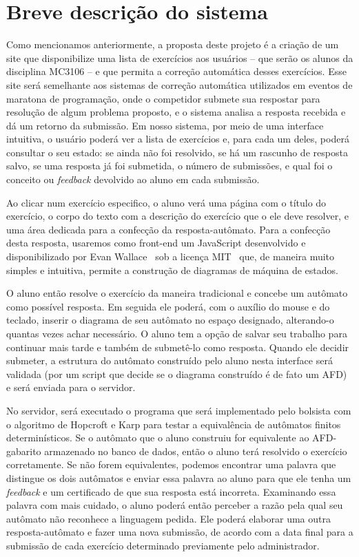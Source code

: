 \documentclass[
	12pt,				%
	openany,
	oneside,
	a4paper,			%
	english,			%
	brazil,				%
	]{abntex2}
\begin{document}
\section {Breve descrição do sistema}

Como mencionamos anteriormente, a proposta deste projeto é a criação de um site que disponibilize uma lista de exercícios aos usuários -- que serão os alunos da disciplina MC3106 -- e que permita a correção automática desses exercícios. Esse site será semelhante aos sistemas de correção automática utilizados em eventos de maratona de programação, onde o competidor submete sua respostar para resolução de algum problema proposto, e o sistema analisa a resposta recebida e dá um retorno da submissão. Em nosso sistema, por meio de uma interface intuitiva, o usuário poderá ver a lista de exercícios e, para cada um deles, poderá consultar o seu estado: se ainda não foi resolvido, se há um rascunho de resposta salvo, se uma resposta já foi submetida, o número de submissões, e qual foi o conceito ou \emph{feedback} devolvido ao aluno em cada submissão.

Ao clicar num exercício especifico, o aluno verá uma página com o título do exercício, o corpo do texto com a descrição do exercício que o ele deve resolver, e uma área dedicada para a confecção da resposta-autômato. Para a confecção desta resposta, usaremos como front-end um JavaScript desenvolvido e disponibilizado por Evan Wallace~\cite{evan} sob a licença MIT~\cite{mit} que, de maneira muito simples e intuitiva, permite a construção de diagramas de máquina de estados.

O aluno então resolve o exercício da maneira tradicional e concebe um autômato como possível resposta. Em seguida ele poderá, com o auxílio do mouse e do teclado, inserir o diagrama de seu autômato no espaço designado, alterando-o quantas vezes achar necessário. O aluno tem a opção de salvar seu trabalho para continuar mais tarde e também de submetê-lo como resposta. Quando ele decidir submeter, a estrutura do autômato construído pelo aluno nesta interface será validada (por um script que decide se o diagrama construído é de fato um AFD) e será enviada para o servidor.

No servidor, será executado o programa que será implementado pelo bolsista com o algoritmo de Hopcroft e Karp para testar a equivalência de autômatos finitos determinísticos. Se o autômato que o aluno construiu for equivalente ao AFD-gabarito armazenado no banco de dados, então o aluno terá resolvido o exercício corretamente. Se não forem equivalentes, podemos encontrar uma palavra que distingue os dois autômatos e enviar essa palavra ao aluno para que ele tenha um \emph{feedback} e um certificado de que sua resposta está incorreta. Examinando essa palavra com mais cuidado, o aluno poderá então perceber a razão pela qual seu autômato não reconhece a linguagem pedida. Ele poderá elaborar uma outra resposta-autômato e fazer uma nova submissão, de acordo com a data final para a submissão de cada exercício determinado previamente pelo administrador.
\end{document}
